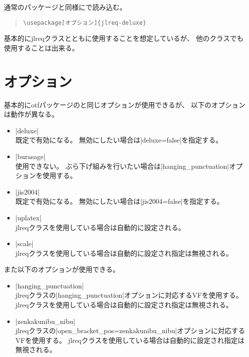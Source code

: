 \documentclass[dvipdfmx,a4paper]{jlreq}
\newcommand{\pkg}[1]{\textsf{#1}}
\newcommand{\cls}[1]{\textsf{#1}}
\newcommand{\cmd}[1]{\eghostguarded{\texttt{\symbol{92}#1}}}
\begin{document}
通常のパッケージと同様に\cmd{usepackage}で読み込む。

\begin{quote}
\begin{verbatim}
\usepackage[オプション]{jlreq-deluxe}
\end{verbatim}
\end{quote}

基本的に\cls{jlreq}クラスとともに使用することを想定しているが、
他のクラスでも使用することは出来る。


\section{オプション}

基本的に\pkg{otf}パッケージのと同じオプションが使用できるが、
以下のオプションは動作が異なる。

\begin{itemize}
\item |deluxe|\\
  既定で有効になる。
  無効にしたい場合は|deluxe=false|を指定する。
\item |burasage|\\
  使用できない。
  ぶら下げ組みを行いたい場合は|hanging_punctuation|オプションを使用する。
\item |jis2004|\\
  既定で有効になる。
  無効にしたい場合は|jis2004=false|を指定する。
\item |uplatex|\\
  \cls{jlreq}クラスを使用している場合は自動的に設定される。
\item |scale|\\
  \cls{jlreq}クラスを使用している場合は自動的に設定され指定は無視される。
\end{itemize}

また以下のオプションが使用できる。

\begin{itemize}
\item |hanging_punctuation|\\
  \cls{jlreq}クラスの|hanging_punctuation|オプションに対応するVFを使用する。
  \cls{jlreq}クラスを使用している場合は自動的に設定され指定は無視される。
\item |zenkakunibu_nibu|\\
  \cls{jlreq}クラスの|open_bracket_pos=zenkakunibu_nibu|オプションに対応するVFを使用する。
  \cls{jlreq}クラスを使用している場合は自動的に設定され指定は無視される。
\end{itemize}
\end{document}
